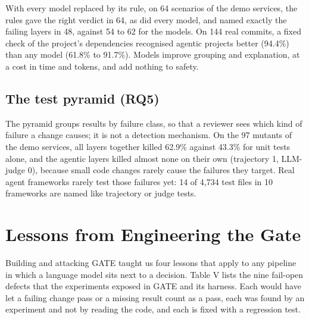 \documentclass[conference]{IEEEtran}
\begin{document}
With every model replaced by its rule, on 64 scenarios of the demo services, the rules gave the right verdict in 64, as did every model, and named exactly the failing layers in 48, against 54 to 62 for the models. On 144 real commits, a fixed check of the project's dependencies recognised agentic projects better (94.4\%) than any model (61.8\% to 91.7\%). Models improve grouping and explanation, at a cost in time and tokens, and add nothing to safety.

\subsection{The test pyramid (RQ5)}\label{the-test-pyramid-rq5}

The pyramid groups results by failure class, so that a reviewer sees which kind of failure a change causes; it is not a detection mechanism. On the 97 mutants of the demo services, all layers together killed 62.9\% against 43.3\% for unit tests alone, and the agentic layers killed almost none on their own (trajectory 1, LLM-judge 0), because small code changes rarely cause the failures they target. Real agent frameworks rarely test those failures yet: 14 of 4,734 test files in 10 frameworks are named like trajectory or judge tests.

\section{Lessons from Engineering the Gate}\label{lessons-from-engineering-the-gate}

Building and attacking GATE taught us four lessons that apply to any pipeline in which a language model sits next to a decision. Table V lists the nine fail-open defects that the experiments exposed in GATE and its harness. Each would have let a failing change pass or a missing result count as a pass, each was found by an experiment and not by reading the code, and each is fixed with a regression test.
\end{document}
